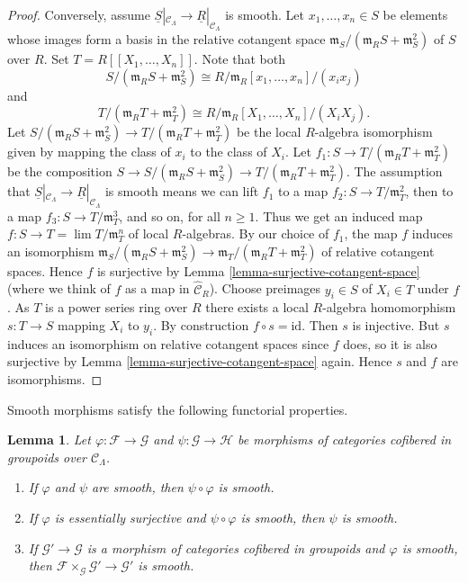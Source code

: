 \documentclass{stacks-project}
\theoremstyle{plain}
\newtheorem{lemma}[subsection]{Lemma}
\theoremstyle{definition}
\theoremstyle{remark}
\numberwithin{equation}{subsection}
\def\lim{\mathop{\mathrm{lim}}\nolimits}
\begin{document}
\begin{proof}
\medskip\noindent
Conversely, assume
$\underline{S}|_{\mathcal{C}_\Lambda} \to \underline{R}|_{\mathcal{C}_\Lambda}$
is smooth. Let $x_1, \ldots, x_n \in S$ be elements whose images
form a basis in the relative cotangent space
$\mathfrak m_S/(\mathfrak m_R S + \mathfrak m_S^2)$ of $S$ over $R$.
Set $T = R[[X_1, \ldots, X_n]]$. Note that both
$$
S/(\mathfrak m_R S + \mathfrak m_S^2) \cong
R/\mathfrak m_R[x_1, \ldots, x_n]/(x_ix_j)
$$
and
$$
T/(\mathfrak m_R T + \mathfrak m_T^2) \cong
R/\mathfrak m_R[X_1, \ldots, X_n]/(X_iX_j).
$$
Let
$S/(\mathfrak m_R S + \mathfrak m_S^2) \to
T/(\mathfrak m_R T + \mathfrak m_T^2)$
be the local $R$-algebra isomorphism given by mapping
the class of $x_i$ to the class of $X_i$. Let
$f_1 : S \to T/(\mathfrak m_R T + \mathfrak m_T^2)$ be the
composition
$S \to S/(\mathfrak m_R S + \mathfrak m_S^2)
\to T/(\mathfrak m_R T + \mathfrak m_T^2)$.
The assumption that
$\underline{S}|_{\mathcal{C}_\Lambda} \to \underline{R}|_{\mathcal{C}_\Lambda}$
is smooth means we can lift $f_1$ to a map
$f_2 : S \to T/\mathfrak{m}_T^2$, then to a map
$f_3 : S \to T/\mathfrak{m}_T^3$, and so on, for all $n \geq 1$. Thus
we get an induced map $f : S \to T = \lim T/\mathfrak m_T^n$
of local $R$-algebras. By our choice of $f_1$, the map $f$ induces an
isomorphism
$\mathfrak m_S/(\mathfrak m_R S + \mathfrak m_S^2) \to
\mathfrak m_T/(\mathfrak m_R T + \mathfrak m_T^2)$
of relative cotangent spaces.
Hence $f$ is surjective by
Lemma \ref{lemma-surjective-cotangent-space}
(where we think of $f$ as a map in $\widehat{\mathcal{C}}_R$).
Choose preimages $y_i \in S$ of $X_i \in T$ under $f$. As $T$ is a
power series ring over $R$ there exists a local
$R$-algebra homomorphism $s : T \to S$ mapping $X_i$ to $y_i$.
By construction $f \circ s = \text{id}$. Then $s$ is injective.
But $s$ induces an isomorphism on relative cotangent spaces since
$f$ does, so it is also surjective by
Lemma \ref{lemma-surjective-cotangent-space}
again. Hence $s$ and $f$ are isomorphisms.
\end{proof}

\noindent
Smooth morphisms satisfy the following functorial properties.

\begin{lemma}
\label{lemma-smooth-properties}
Let $\varphi : \mathcal{F} \to \mathcal{G}$ and $\psi : \mathcal{G}
\to \mathcal{H}$ be morphisms of categories cofibered in groupoids over
$\mathcal{C}_\Lambda$.
\begin{enumerate}
\item If $\varphi$ and $\psi$ are smooth, then $\psi \circ \varphi$ is smooth.
\item If $\varphi$ is essentially surjective and $\psi \circ \varphi$ is
smooth, then $\psi$ is smooth.
\item If $\mathcal{G}' \to \mathcal{G}$ is a morphism of categories
cofibered in groupoids and $\varphi$ is smooth, then
$\mathcal{F} \times_\mathcal{G} \mathcal{G}' \to \mathcal{G}'$ is smooth.
\end{enumerate}
\end{lemma}
\end{document}
